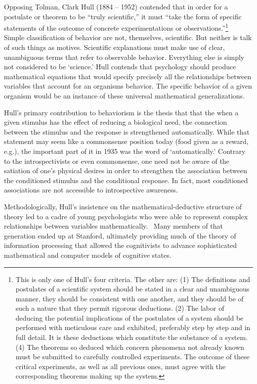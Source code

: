 \begin{refsection}
Opposing Tolman, Clark Hull (1884 – 1952) contended that in order for a postulate or theorem to be “truly scientific,” it must “take the form of specific statements of the outcome of concrete experimentations or observations.”\footnote{This is only one of Hull's four criteria. The other are: (1) The definitions and postulates of a scientific system should be stated in a clear and unambiguous manner, they should be consistent with one another, and they should be of such a nature that they permit rigorous deductions. (2) The labor of deducing the potential implications of the postulates of a system should be performed with meticulous care and exhibited, preferably step by step and in full detail. It is these deductions which constitute the substance of a system. (4) The theorems so deduced which concern phenomena not already known must be submitted to carefully controlled experiments. The outcome of these critical experiments, as well as all previous ones, must agree with the corresponding theorems making up the system.} ~\citep{Hull:1940tm} Simple classification of behavior are not, themselves, scientific. But neither is talk of such things as motives. Scientific explanations must make use of clear, unambiguous terms that refer to observable behavior. Everything else is simply not considered to be `science.' Hull contends that psychology should produce mathematical equations that would specify precisely all the relationships between variables that account for an organisms behavior. The specific behavior of a given organism would be an instance of these universal mathematical generalizations.

Hull's primary contribution to behaviorism is the thesis that that the when a given stimulus has the effect of reducing a biological need, the connection between the stimulus and the response is strengthened automatically. While that statement may seem like a commonsense position today (food given as a reward, e.g.), the important part of it in 1935 was the word of `automatically.' Contrary to the introspectivists or even commonsense, one need not be aware of the satiation of one's physical desires in order to strengthen the association between the conditioned stimulus and the conditional response. In fact, most conditioned associations are not accessible to introspective awareness.

Methodologically, Hull's insistence on the mathematical-deductive structure of theory led to a cadre of young psychologists who were able to represent complex relationships between variables mathematically.~\citep{Hull:1940tm} Many members of that generation ended up at Stanford, ultimately providing much of the theory of information processing that allowed the cognitivists to advance sophisticated mathematical and computer models of cognitive states.


\end{refsection}
